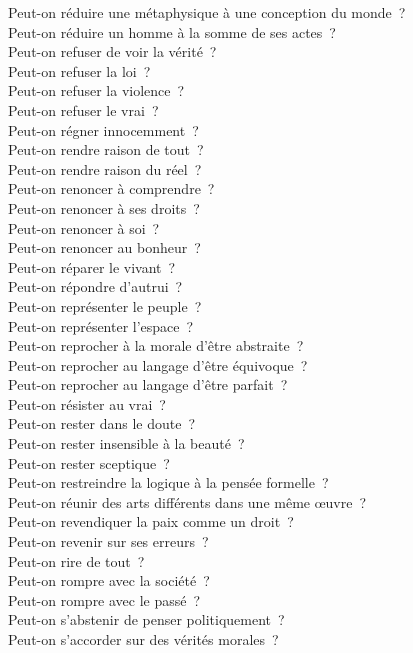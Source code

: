 \documentclass[a4paper,12pt]{article}
\begin{document}
Peut-on réduire une métaphysique à une conception du monde ? \\
Peut-on réduire un homme à la somme de ses actes ? \\
Peut-on refuser de voir la vérité ? \\
Peut-on refuser la loi ? \\
Peut-on refuser la violence ? \\
Peut-on refuser le vrai ? \\
Peut-on régner innocemment ? \\
Peut-on rendre raison de tout ? \\
Peut-on rendre raison du réel ? \\
Peut-on renoncer à comprendre ? \\
Peut-on renoncer à ses droits ? \\
Peut-on renoncer à soi ? \\
Peut-on renoncer au bonheur ? \\
Peut-on réparer le vivant ? \\
Peut-on répondre d'autrui ? \\
Peut-on représenter le peuple ? \\
Peut-on représenter l'espace ? \\
Peut-on reprocher à la morale d'être abstraite ? \\
Peut-on reprocher au langage d'être équivoque ? \\
Peut-on reprocher au langage d'être parfait ? \\
Peut-on résister au vrai ? \\
Peut-on rester dans le doute ? \\
Peut-on rester insensible à la beauté ? \\
Peut-on rester sceptique ? \\
Peut-on restreindre la logique à la pensée formelle ? \\
Peut-on réunir des arts différents dans une même œuvre ? \\
Peut-on revendiquer la paix comme un droit ? \\
Peut-on revenir sur ses erreurs ? \\
Peut-on rire de tout ? \\
Peut-on rompre avec la société ? \\
Peut-on rompre avec le passé ? \\
Peut-on s'abstenir de penser politiquement ? \\
Peut-on s'accorder sur des vérités morales ? \\
\end{document}
